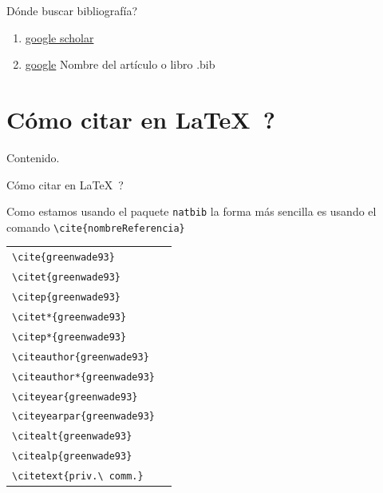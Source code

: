 \documentclass[dvipsnames,xcolor=x11names]{beamer}
\theoremstyle{plain}
\theoremstyle{definition}
\begin{document}
\begin{frame}{\textquestiondown Dónde buscar bibliografía?}
    \begin{enumerate}[<+->]
    \item \href{https://scholar.google.com.co}{google scholar}
    \item \href{https://google.com.co}{google} Nombre del artículo o libro .bib
    \end{enumerate}
\end{frame}

\section{\textquestiondown Cómo citar en \LaTeX\ ?}
\begin{frame}{Contenido.}
  \tableofcontents[currentsection]
\end{frame}

\begin{frame}[fragile]{\textquestiondown Cómo citar en \LaTeX\ ?}

Como estamos usando el paquete \verb!natbib! la forma más sencilla es usando el comando \verb!\cite{nombreReferencia}!

\begin{tabular}{l|l}
\verb!\cite{greenwade93}! &  \cite{greenwade93}\\
\verb!\citet{greenwade93}! &\citet{greenwade93}\\
\verb!\citep{greenwade93}! & \citep{greenwade93}	\\	
\verb!\citet*{greenwade93}! &\citet*{greenwade93}\\
\verb!\citep*{greenwade93}! & \citep*{greenwade93}\\
\verb!\citeauthor{greenwade93}! & \citeauthor{greenwade93}\\
\verb!\citeauthor*{greenwade93}! & \citeauthor*{greenwade93}\\
\verb!\citeyear{greenwade93}! & \citeyear{greenwade93}\\
\verb!\citeyearpar{greenwade93}! &\citeyearpar{greenwade93}\\
\verb!\citealt{greenwade93}! & \citealt{greenwade93}\\
\verb!\citealp{greenwade93}! & \citealp{greenwade93}\\
\verb!\citetext{priv.\ comm.}! & \citetext{priv.\ comm.}
\end{tabular}
    
\end{frame}
\end{document}
